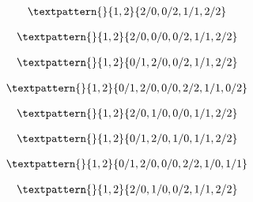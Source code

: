 \begin{equation}
	\begin{gathered}
		\textpattern{}{1,2}{2/0,0/2,1/1,2/2}
	\end{gathered}
	\label{cls:118}
\end{equation}

\begin{equation}
	\begin{gathered}
		\textpattern{}{1,2}{2/0,0/0,0/2,1/1,2/2}
	\end{gathered}
	\label{cls:119}
\end{equation}

\begin{equation}
	\begin{gathered}
		\textpattern{}{1,2}{0/1,2/0,0/2,1/1,2/2}
	\end{gathered}
	\label{cls:120}
\end{equation}

\begin{equation}
	\begin{gathered}
		\textpattern{}{1,2}{0/1,2/0,0/0,2/2,1/1,0/2}
	\end{gathered}
	\label{cls:121}
\end{equation}

\begin{equation}
	\begin{gathered}
		\textpattern{}{1,2}{2/0,1/0,0/0,1/1,2/2}
	\end{gathered}
	\label{cls:122}
\end{equation}

\begin{equation}
	\begin{gathered}
		\textpattern{}{1,2}{0/1,2/0,1/0,1/1,2/2}
	\end{gathered}
	\label{cls:123}
\end{equation}

\begin{equation}
	\begin{gathered}
		\textpattern{}{1,2}{0/1,2/0,0/0,2/2,1/0,1/1}
	\end{gathered}
	\label{cls:124}
\end{equation}

\begin{equation}
	\begin{gathered}
		\textpattern{}{1,2}{2/0,1/0,0/2,1/1,2/2}
	\end{gathered}
	\label{cls:125}
\end{equation}

